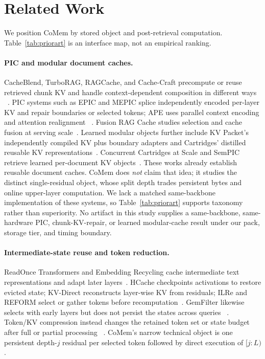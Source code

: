 \section{Related Work}
\label{sec:related}

We position CoMem by stored object and post-retrieval computation.
Table~\ref{tab:priorart} is an interface map, not an empirical ranking.



\paragraph{PIC and modular document caches.}
CacheBlend, TurboRAG, RAGCache, and Cache-Craft precompute or reuse retrieved
chunk KV and handle context-dependent composition in different ways
~\citep{cacheblend,turborag,ragcache,cachecraft}. PIC systems such as EPIC and
MEPIC splice independently encoded per-layer KV and repair boundaries or
selected tokens; APE uses parallel context encoding and attention realignment
~\citep{epic,mepic,ape}. Fusion RAG Cache studies selection and cache fusion at
serving scale~\citep{fusionrag}. Learned modular objects further include KV
Packet's independently compiled KV plus boundary adapters and Cartridges'
distilled reusable KV representations~\citep{kvpacket,cartridgesbase}.
Concurrent Cartridges at Scale and SemPIC retrieve learned per-document KV
objects~\citep{cartridges,sempic}. These works already establish reusable
document caches. CoMem does \emph{not} claim that idea; it studies the distinct
single-residual object, whose split depth trades persistent bytes and online
upper-layer computation. We lack a matched same-backbone implementation of
these systems, so Table~\ref{tab:priorart} supports taxonomy rather than
superiority. No artifact in this study supplies a same-backbone, same-hardware
PIC, chunk-KV-repair, or learned modular-cache result under our pack, storage
tier, and timing boundary.

\paragraph{Intermediate-state reuse and token reduction.}
ReadOnce Transformers and Embedding Recycling cache intermediate text
representations and adapt later layers~\citep{readonce,embeddingrecycling}.
HCache checkpoints activations to restore evicted state; KV-Direct reconstructs
layer-wise KV from residuals; ILRe and REFORM select or gather tokens before
recomputation~\citep{hcache,kvdirect,ilre,reform}. GemFilter likewise selects
with early layers but does not persist the states across queries
~\citep{gemfilter}. Token/KV compression instead changes the retained token set
or state budget after full or partial processing
~\citep{streamingllm,h2o,snapkv,pyramidkv,minicache}. CoMem's narrow technical
object is one persistent depth-$j$ residual per selected token followed by
direct execution of $[j{:}L)$.

